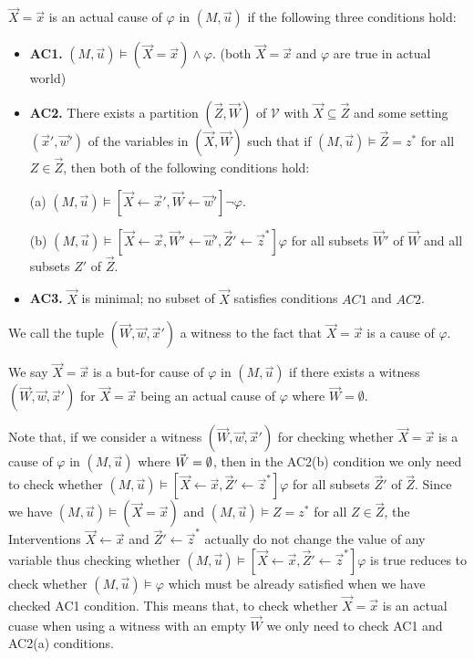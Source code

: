 \begin{definition}
    $\vec X = \vec x$ is an actual cause of $\varphi$ in $(M,\vec u)$ if the following three conditions hold:
    \begin{itemize}
        \item  \textbf{AC1.} $(M,\vec u)\models (\vec X = \vec x) \wedge \varphi$.
              (both $\vec X = \vec x$ and $\varphi$ are true in actual world)
        \item  \textbf{AC2. }There exists a partition $(\vec Z, \vec W)$ of $\mathcal{V}$ with $\vec X \subseteq \vec Z$ and some setting $(\vec x',\vec w')$ of the variables in $(\vec X,\vec W)$ such that if $(M,\vec u)\models \vec Z = z^*$ for all $Z\in \vec Z$, then both of the following conditions hold:

              (a) $(M,\vec u)\models[\vec X \leftarrow \vec x', \vec W \leftarrow \vec w']\neg \varphi$.

              (b) $(M,\vec u)\models[\vec X\leftarrow \vec x, \vec W' \leftarrow \vec w', \vec Z'\leftarrow \vec z^*]\varphi$ for all subsets $\vec W'$ of $\vec W$ and all subsets $Z'$ of $\vec Z$.

        \item  \textbf{AC3.} $\vec X$ is minimal; no subset of $\vec X$ satisfies conditions $AC1$ and $AC2$.
    \end{itemize}
\end{definition}
We call the tuple $(\vec W, \vec w,\vec x')$ a witness to the fact that $\vec X=\vec x$ is a cause of $\varphi$.

\begin{definition}
    We say $\vec X = \vec x$ is a but-for cause of $\varphi$ in
    $(M,\vec u)$ if there exists a witness $(\vec W, \vec w, \vec x')$
    for $\vec X = \vec x$ being an actual cause of $\varphi$
    where $\vec W = \emptyset $.
\end{definition}

Note that, if we consider a witness $(\vec W, \vec w, \vec x')$
for checking whether $\vec X = \vec x$ is a cause of $\varphi$
in $(M,\vec u)$ where $\vec W = \emptyset$, then in the AC2(b) condition
we only need to check whether $(M,\vec u) \vDash [\vec X \leftarrow \vec x, \vec Z' \leftarrow \vec z^*]\varphi$ for all subsets $\vec Z'$
of $\vec Z$.
Since we have $(M,\vec u) \vDash (\vec X = \vec x)$ and
$(M,\vec u) \vDash Z = z^*$ for all $Z \in \vec Z$,
the Interventions $\vec X \leftarrow \vec x$ and
$\vec Z ' \leftarrow \vec z^*$ actually do not change the value of
any variable thus checking whether
$(M,\vec u) \vDash [\vec X \leftarrow \vec x, \vec Z' \leftarrow \vec z^*]\varphi$ is true
reduces to check whether $(M,\vec u) \vDash \varphi$
which must be already satisfied when we have checked AC1 condition.
This means that, to check whether $\vec X = \vec x$ is an actual cuase when using a witness with an empty $\vec W$
we only need to check AC1 and AC2(a) conditions.
